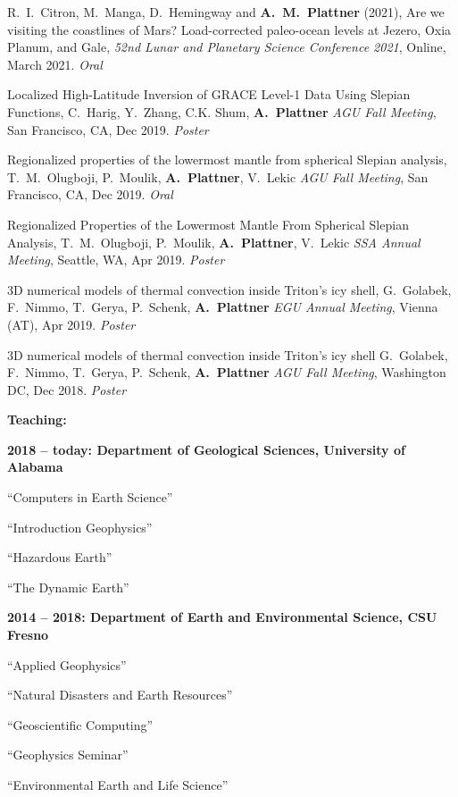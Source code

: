 \documentclass[10pt]{article}
\begin{document}
\spcp R.~I.~Citron, M.~Manga, D.~Hemingway and \textbf{A.~M.~Plattner}
(2021), Are we visiting the coastlines of Mars? Load-corrected
paleo-ocean levels at Jezero, Oxia Planum, and Gale, \emph{52nd Lunar
and Planetary Science Conference 2021}, Online, March 2021.
\emph{Oral}

\spcp
Localized High-Latitude Inversion of GRACE Level-1 Data Using Slepian Functions,
C.~Harig, Y.~Zhang, C.K. Shum, \textbf{A.~Plattner}
\emph{AGU Fall Meeting}, San Francisco, CA, Dec 2019. \emph{Poster}

\spcp
Regionalized properties of the lowermost mantle from spherical Slepian analysis,
T.~M.~Olugboji, P.~Moulik, \textbf{A.~Plattner}, V.~Lekic
\emph{AGU Fall Meeting}, San Francisco, CA, Dec 2019. \emph{Oral}

\spcp Regionalized Properties of the Lowermost Mantle From Spherical
Slepian Analysis, T.~M.~Olugboji, P.~Moulik, \textbf{A.~Plattner},
V.~Lekic \emph{SSA Annual Meeting}, Seattle, WA, Apr
2019. \emph{Poster}

\spcp 3D numerical models of thermal convection inside Triton’s icy
shell, G.~Golabek, F.~Nimmo, T.~Gerya, P.~Schenk, \textbf{A.~Plattner}
\emph{EGU Annual Meeting}, Vienna (AT), Apr 2019. \emph{Poster}

\spcp 3D numerical models of thermal convection inside Triton's icy
shell G.~Golabek, F.~Nimmo, T.~Gerya, P.~Schenk, \textbf{A.~Plattner}
\emph{AGU Fall Meeting}, Washington DC, Dec 2018. \emph{Poster}





\spc
\textbf{\tsize Teaching:}

\spcp
\textbf{2018 -- today: Department of Geological Sciences,
University of Alabama}

``Computers in Earth Science''

``Introduction Geophysics''

``Hazardous Earth''

``The Dynamic Earth''

\spcp
\textbf{2014 -- 2018:  Department of Earth and Environmental Science, CSU Fresno}

``Applied Geophysics''

``Natural Disasters and Earth Resources''

``Geoscientific Computing''

``Geophysics Seminar''

``Environmental Earth and Life Science''
\end{document}
